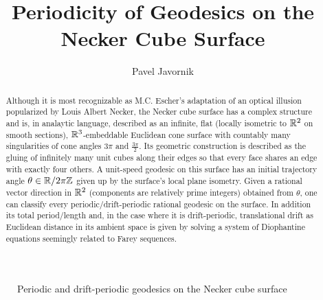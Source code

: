 \documentclass[]{article}
\begin{document}
\newtheorem{thm}{Theorem}[]
\newtheorem{Def}{Definition}[]
\newtheorem*{thm*}{Theorem}
\newtheorem*{def*}{Definition}
\newtheorem{lem}{Lemma}
\newtheorem*{rem}{Remark}
\newcommand{\shiftleft}[2]{\makebox[0pt][r]{\makebox[#1][l]{#2}}}
\newtheorem*{conj}{Conjecture}
\newtheorem{cor}{Corollary}[]

\newcommand{\compav}[1]{\textbf{\textcolor{blue}{#1}}}
\newcommand{\compat}[1]{\textbf{\textcolor{red}{#1}}}
\graphicspath{{images/}}



\title{Periodicity of Geodesics on the Necker Cube Surface}
\author{Pavel Javornik}

\maketitle

%

\begin{abstract}
\noindent Although it is most recognizable as M.C. Escher's adaptation of an optical illusion popularized by Louis Albert Necker, the Necker cube surface has a complex structure and is, in analaytic language, described as an infinite, flat (locally isometric to $\mathbb{R}^2$ on smooth sections), $\mathbb{R}^3$-embeddable Euclidean cone surface with countably many singularities of cone angles $3\pi$ and $\frac{3\pi}{2}$. Its geometric construction is described as the gluing of infinitely many unit cubes along their edges so that every face shares an edge with exactly four others. A unit-speed geodesic on this surface has an initial trajectory angle $\theta\in\mathbb{R}/2\pi\mathbb{Z}$ given up by the surface's local plane isometry. Given a rational vector direction in $\mathbb{R}^2$ (components are relatively prime integers) obtained from $\theta$, one can classify every periodic/drift-periodic rational geodesic on the surface. In addition its total period/length and, in the case where it is drift-periodic, translational drift as Euclidean distance in its ambient space is given by solving a system of Diophantine equations seemingly related to Farey sequences.
\end{abstract}
\begin{figure}[H]
\centering

\label{fig:front}
\caption{Periodic and drift-periodic geodesics on the Necker cube surface}
\end{figure}
\end{document}
